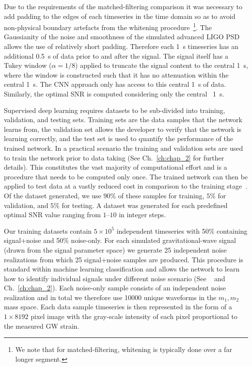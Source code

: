 %
%
Due to the requirements of the matched-filtering comparison it was 
necessary to add padding to the edges of each timeseries in the 
time domain so as to avoid non-physical boundary artefacts from 
the whitening procedure~\footnote{We note that for matched-filtering, 
whitening is typically done over a far longer segment.}. 
The Gaussianity of the noise and smoothness of the simulated 
advanced \ac{LIGO} \ac{PSD} allows the use of relatively short 
padding. Therefore each 1~s timeseries has an additional 0.5~s 
of data prior to and after the signal. The signal itself has a 
Tukey window ($\alpha=1/8$) applied to truncate the signal 
content to the central 1~s, where the window is constructed such that it 
has no attenuation within the central 1~s. The \ac{CNN} approach 
only has access to this central 1~s of data. Similarly, 
the optimal \ac{SNR} is computed considering only the 
central~
1~s.

%
%
Supervised deep learning requires datasets to be sub-divided into training, validation, and testing sets. Training sets are the data samples that the network learns from, the validation set allows the developer to verify that the network is learning correctly, and the test set is used to quantify the performance of the trained network.  In a practical scenario the training and validation sets are used to train the network prior to data taking (See Ch.~\ref{ch:chap_2} for further details). This constitutes the vast majority of computational effort and is a procedure that needs to be computed only once. The trained network can then be applied to test data at a vastly reduced cost in comparison to the training stage~\cite{Goodfellow-et-al-2016}. Of the dataset generated, we use $90\%$ of these samples for training, $5\%$ for validation, and $5\%$ for testing. A dataset was generated for each predefined optimal \ac{SNR} value ranging from $1$--$10$ in integer steps. 

%
%
Our training datasets contain $5\times 10^{5}$ independent timeseries with 
50\% containing signal+noise and 50\% noise-only. For each simulated
gravitational-wave signal (drawn from the signal parameter space) we 
generate 25 independent noise realizations from which 25 signal+noise 
samples are produced. This procedure is standard within machine 
learning classification and allows the network to learn how to 
identify individual signals under different noise scenario (See
~\cite{10.5555/525960} and Ch.~\ref{ch:chap_2}). Each noise-only 
sample consists of an independent noise realization and in 
total we therefore use 10000 unique waveforms in the $m_{1},m_{2}$ mass 
space. Each data sample timeseries is then represented in the form of a 
$1 \times 8192$ pixel image with the gray-scale intensity of each 
pixel proportional to the measured \ac{GW} strain.

